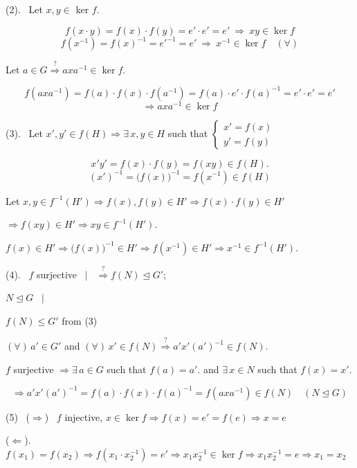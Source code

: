 \bigskip
\noindent (2). \ Let $x,y\in$ ker $f$.

\[
f(x\cdot y) = f(x)\cdot f(y) = e'\cdot e' = e' \ \Rightarrow \ xy\in\ker f
\]
\[
f(x^{-1}) = f(x)^{-1} = e'^{-1} = e' \ \Rightarrow \ x^{-1}\in\ker f \quad (\forall)
\]

\bigskip
\noindent Let $a\in G \overset{?}{\Rightarrow} axa^{-1}\in\ker f$.

\[
f(axa^{-1}) = f(a)\cdot f(x)\cdot f(a^{-1}) = f(a)\cdot e'\cdot f(a)^{-1} = e'\cdot e' = e'
\]
\[
\Rightarrow axa^{-1}\in\ker f
\]

\bigskip
\noindent (3). \ Let $x',y'\in f(H) \Rightarrow \exists\,x,y\in H$ such that $\begin{cases}x'=f(x)\\y'=f(y)\end{cases}$

\[
x'y' = f(x)\cdot f(y) = f(xy) \in f(H).
\]
\[
(x')^{-1} = \big(f(x)\big)^{-1} = f(x^{-1}) \in f(H)
\]

\bigskip
\noindent Let $x,y\in f^{-1}(H') \Rightarrow f(x),f(y)\in H' \Rightarrow f(x)\cdot f(y)\in H'$

\noindent $\Rightarrow f(xy)\in H' \Rightarrow xy\in f^{-1}(H')$.

\noindent $f(x)\in H' \Rightarrow \big(f(x)\big)^{-1}\in H' \Rightarrow f(x^{-1})\in H' \Rightarrow x^{-1}\in f^{-1}(H')$.

\bigskip
\noindent (4). \ $f$ surjective \ $\Big|$ \ $\overset{?}{\Rightarrow} f(N)\trianglelefteq G'$;

\noindent $N\trianglelefteq G$ \ $\Big|$

\noindent $f(N)\leq G'$ from (3)

\bigskip
\noindent $(\forall)\,a'\in G'$ and $(\forall)\,x'\in f(N) \overset{?}{\Rightarrow} a'x'(a')^{-1}\in f(N)$.

\noindent $f$ surjective $\Rightarrow \exists\,a\in G$ such that $f(a)=a'$. \quad and $\exists\,x\in N$ such that $f(x)=x'$.

\[
\Rightarrow a'x'(a')^{-1} = f(a)\cdot f(x)\cdot f(a)^{-1} = f(axa^{-1}) \in f(N) \quad (N\trianglelefteq G)
\]

\bigskip
\noindent (5) \ ($\Rightarrow$) \ $f$ injective, $x\in\ker f \Rightarrow f(x)=e'=f(e) \Rightarrow x=e$

\noindent ($\Leftarrow$). \ $f(x_1)=f(x_2) \Rightarrow f(x_1\cdot x_2^{-1})=e' \Rightarrow x_1x_2^{-1}\in\ker f \Rightarrow x_1x_2^{-1}=e \Rightarrow x_1=x_2$


